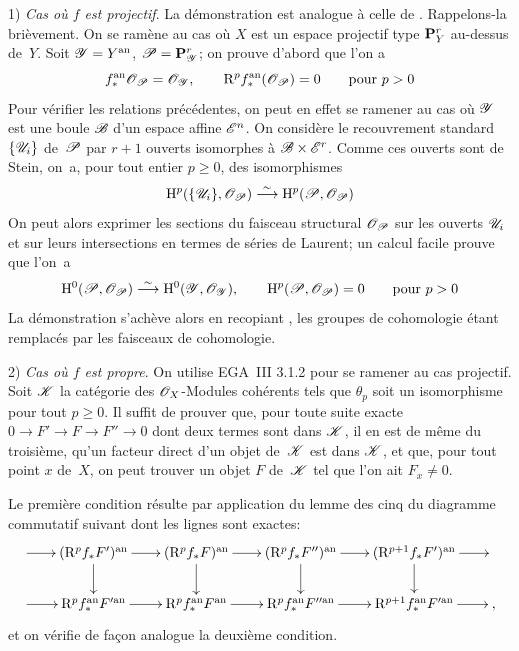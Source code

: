 1) \emph{Cas où $f$ est projectif}. La d\'emonstration est
analogue \`a celle de \cite[]{XII.10}. Rappelons-la bri\`evement. On
se ram\`ene au cas o\`u $X$ est un espace projectif type $\mathbf{P}^r_Y
$ au-dessus de~$Y$. Soit $\cal{Y} = Y^\an$, $\cal{P} = \PP^r_\cal{Y}$;
on prouve d'abord que l'on a
$$
f_*^\an \cal{O}_\cal{P} = \cal{O}_\cal{Y} \quoi, \qquad \R^p f_*^\an
(\cal{O}_\cal{P}) = 0 \qquad \text{pour } p>0
$$
Pour v\'erifier les relations pr\'ec\'edentes, on peut en effet
se ramener au cas o\`u $\cal{Y}$ est une boule $\cal{B}$ d'un espace
affine $\cal{E}^n$. On consid\`ere le \og recouvrement standard\fg $\{
\cal{U}_i \}$ de~$\cal{P}$ par $r+1$ ouverts isomorphes \`a $\cal{B}
\times \cal{E}^r$. Comme ces ouverts sont de Stein, on~a, pour tout
entier $p \geq 0$, des isomorphismes
$$
\H^p (\{ \cal{U}_i \}, \cal{O}_\cal{P}) \isomto \H^p (\cal{P},
\cal{O}_\cal{P})
$$
On peut alors exprimer les sections du faisceau structural
$\cal{O}_\cal{P}$ sur les ouverts $\cal{U}_i $ et sur leurs
intersections en termes de s\'eries de Laurent; un calcul facile
prouve que l'on~a
$$
\H^0 (\cal{P}, \cal{O}_\cal{P} ) \isomto \H^0 (\cal{Y},
\cal{O}_\cal{Y} ) \quoi, \qquad \H^p (\cal{P}, \cal{O}_\cal{P} ) = 0
\qquad \text{pour } p>0
$$
La d\'emonstration s'ach\`eve alors en recopiant \cite[
lemme~5]{XII.10}, les groupes de cohomologie \'etant remplac\'es par les
faisceaux de cohomologie.

2)
\emph{Cas où $f$ est propre}. On utilise EGA~III 3.1.2 pour se
ramener au cas projectif. Soit $\cal{K}$ la cat\'egorie des
$\cal{O}_X$-Modules coh\'erents tels que $\theta_p$ soit un
isomorphisme pour tout $p \geq 0$. Il suffit de prouver que, pour
toute suite exacte $0 \to F' \to F \to F'' \to 0$
dont deux termes sont dans $\cal{K}$, il en est de m\^eme du
troisi\`eme, qu'un facteur direct d'un objet de~$\cal{K}$ est dans
$\cal{K}$, et que, pour tout point $x$ de~$X$, on peut trouver un
objet $F$ de~$\cal{K}$ tel que l'on ait $F_x \neq 0$.

Le premi\`ere condition r\'esulte par application du lemme des
cinq du diagramme commutatif suivant dont les lignes sont exactes:
$$
\xymatrix@=.7cm{ \ar[r] &{(\R^p f_* F')^\an}\ar[d]\ar[r]&{(\R^p f_*
F)^\an}\ar[d]\ar[r]&{(\R^p f_* F'')^\an}\ar[d]\ar[r]&{(\R^{p+1} f_* F' )^\an}\ar[r]\ar[d]&{\,}\\ \ar[r] &{\R^p
f_*^\an F'^\an}\ar[r]&{\R^p f_*^\an F^\an}\ar[r]&{\R^p
f_*^\an F''^\an}\ar[r]&{\R^{p+1} f_*^\an F'^\an}\ar[r]&{\quoi,}}
$$
et on v\'erifie de fa\c{c}on analogue la deuxi\`eme condition.

